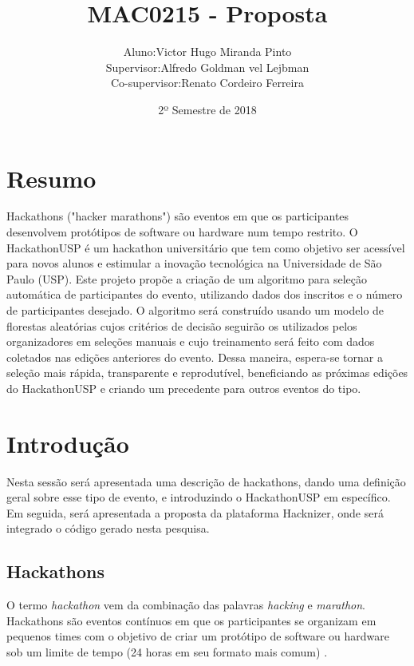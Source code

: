 \documentclass[10pt,twoside,a4paper]{article}
\title{MAC0215 - Proposta}
\author{
  \begin{tabular}{rl}
    Aluno:      & Victor Hugo Miranda Pinto \\
    Supervisor: & Alfredo Goldman vel Lejbman \\
    Co-supervisor: & Renato Cordeiro Ferreira
  \end{tabular}
}
\date{2º Semestre de 2018}
\begin{document}
\onehalfspacing

\maketitle

\section{Resumo}
  Hackathons ("hacker marathons") são eventos em que os participantes desenvolvem protótipos de software ou hardware num tempo restrito. O HackathonUSP é um hackathon universitário que tem como objetivo ser acessível para novos alunos e estimular a inovação tecnológica na Universidade de São Paulo (USP). Este projeto propõe a criação de um algoritmo para seleção automática de participantes do evento, utilizando dados dos inscritos e o número de participantes desejado. O algoritmo será construído usando um modelo de florestas aleatórias cujos critérios de decisão seguirão os utilizados pelos organizadores em seleções manuais e cujo treinamento será feito com dados coletados nas edições anteriores do evento. Dessa maneira, espera-se tornar a seleção mais rápida, transparente e reprodutível, beneficiando as próximas edições do HackathonUSP e criando um precedente para outros eventos do tipo.

\section{Introdução}

  Nesta sessão será apresentada uma descrição de hackathons, dando uma definição geral sobre esse tipo de evento, e introduzindo o HackathonUSP em específico. Em seguida, será apresentada a proposta da plataforma Hacknizer, onde será integrado o código gerado nesta pesquisa.

  \subsection{Hackathons}
  
    O termo \textit{hackathon} vem da combinação das palavras \textit{hacking} e \textit{marathon}. Hackathons são eventos contínuos em que os participantes se organizam em pequenos times com o objetivo de criar um protótipo de software ou hardware sob um limite de tempo (24 horas em seu formato mais comum) \cite{Komssi2015WhatFor}.
    
\end{document}
